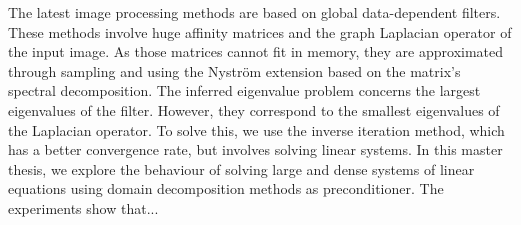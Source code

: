The latest image processing methods are based on global data-dependent filters.
These methods involve huge affinity matrices and the graph Laplacian operator of the input image.
As those matrices cannot fit in memory, they are approximated through sampling and using the Nystr\"om extension based on the matrix's spectral decomposition.
The inferred eigenvalue problem concerns the largest eigenvalues of the filter.
However, they correspond to the smallest eigenvalues of the Laplacian operator.
To solve this, we use the inverse iteration method, which has a better convergence rate, but involves solving linear systems.
In this master thesis, we explore the behaviour of solving large and dense systems of linear equations using domain decomposition methods as preconditioner.
The experiments show that...
